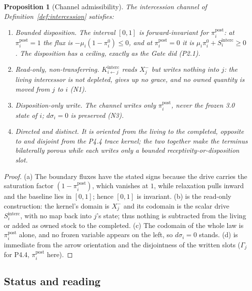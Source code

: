 \documentclass[11pt,a4paper]{article}
\theoremstyle{definition}
\theoremstyle{plain}
\newtheorem{proposition}[definition]{Proposition}
\theoremstyle{remark}
\begin{document}
\begin{proposition}[Channel admissibility]\label{prop:interbound}
The intercession channel of Definition~\ref{def:intercession} satisfies:
\begin{enumerate}[label=\textup{(\alph*)},leftmargin=1.2cm]
\item \emph{Bounded disposition.} The interval \([0,1]\) is forward-invariant for
\(\pi_i^{\mathrm{post}}\): at \(\pi_i^{\mathrm{post}}=1\) the flux is
\(-\mu_i(1-\pi_i^{0})\le0\), and at \(\pi_i^{\mathrm{post}}=0\) it is
\(\mu_i\pi_i^{0}+S_i^{\mathrm{interc}}\ge0\). The disposition has a ceiling, exactly as the
Gate did (P2.1).
\item \emph{Read-only, non-transferring.} \(K^{\mathrm{interc}}_{i\leftarrow j}\) reads
\(X_j^{-}\) but writes nothing into \(j\): the living intercessor is not depleted, gives up no
grace, and no owned quantity is moved from \(j\) to \(i\) (N1).
\item \emph{Disposition-only write.} The channel writes only \(\pi_i^{\mathrm{post}}\), never
the frozen 3.0 state of \(i\); \(d\sigma_i=0\) is preserved (N3).
\item \emph{Directed and distinct.} It is oriented from the living to the completed, opposite
to and disjoint from the P4.4 trace kernel; the two together make the terminus bilaterally
porous while each writes only a bounded receptivity-or-disposition slot.
\end{enumerate}
\end{proposition}

\begin{proof}
(a) The boundary fluxes have the stated signs because the drive carries the saturation factor
\((1-\pi_i^{\mathrm{post}})\), which vanishes at \(1\), while relaxation pulls inward and the
baseline lies in \([0,1]\); hence \([0,1]\) is invariant. (b) is the read-only construction:
the kernel's domain is \(X_j^{-}\) and its codomain is the scalar drive \(S_i^{\mathrm{interc}}\),
with no map back into \(j\)'s state; thus nothing is subtracted from the living or added as
owned stock to the completed. (c) The codomain of the whole law is \(\pi_i^{\mathrm{post}}\)
alone, and no frozen variable appears on the left, so \(d\sigma_i=0\) stands. (d) is immediate
from the arrow orientation and the disjointness of the written slots
(\(\Gamma_j\) for P4.4, \(\pi_i^{\mathrm{post}}\) here). \qedhere
\end{proof}

\subsection{Status and reading}
\end{document}

